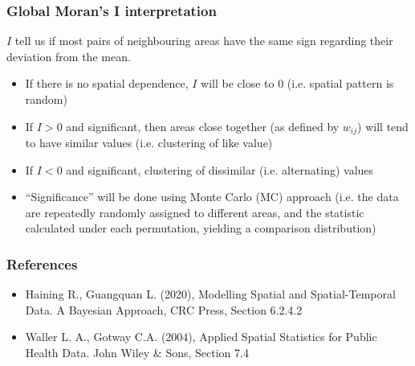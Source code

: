 \documentclass[12pt]{beamer}
\begin{document}
\begin{frame}
\frametitle{Global Moran's I interpretation}
$I$ tell us if most pairs of neighbouring areas have the same sign regarding their deviation from the mean.
\begin{itemize}\setlength\itemsep{\fill}
    \item If there is no spatial dependence, $I$ will be close to 0 (i.e. spatial pattern is random)
    \item If $I > 0$ and significant, then areas close together (as defined by $w_{ij}$) will tend to have similar values (i.e. clustering of like value)
    \item If $I < 0$ and significant, clustering of dissimilar (i.e. alternating) values
    \item ``Significance'' will be done using Monte Carlo (MC) approach (i.e. the data are repeatedly randomly assigned to different areas, and the statistic calculated under each permutation, yielding a comparison distribution)
\end{itemize}
\end{frame}

\begin{frame}
\frametitle{References}
\begin{itemize}\setlength\itemsep{\fill}
\item Haining R., Guangquan L. (2020), Modelling Spatial and Spatial-Temporal Data. A Bayesian Approach, CRC Press, Section 6.2.4.2
\item Waller L. A., Gotway C.A. (2004), Applied Spatial Statistics for Public Health Data. John Wiley \& Sons,  Section 7.4
\end{itemize}
\end{frame}
\end{document}
